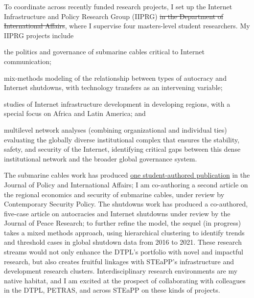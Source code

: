 \documentclass[11pt]{letter}
\begin{document}
\begin{letter}
To coordinate across recently funded research projects, I set up the Internet Infrastructure and Policy Research Group (IIPRG) \sout{in the Department of International Affairs}, where I supervise four masters-level student researchers.
%
My IIPRG projects include %
%
\begin{inparaenum}
  \item the politics and governance of submarine cables critical to Internet communication; 
  \item mix-methods modeling of the relationship between types of autocracy and Internet shutdowns, with technology transfers as an intervening variable; 
  \item studies of Internet infrastructure development in developing regions, with a special focus on Africa and Latin America; and 
  \item multilevel network analyses (combining organizational and individual ties) evaluating the globally diverse institutional complex that ensures the stability, safety, and security of the Internet, identifying critical gaps between this dense institutional network and the broader global governance system.
\end{inparaenum}  
%
The submarine cables work has produced \href{https://jpia.princeton.edu/news/leveraging-submarine-cables-political-gain-us-responses-chinese-strategy}{one student-authored publication} in the Journal of Policy and International Affairs; I am co-authoring a second article on the regional economics and security of submarine cables, under review by Contemporary Security Policy.
%
The shutdowns work has produced a co-authored, five-case article on autocracies and Internet shutdowns under review by the Journal of Peace Research; to further refine the model, the sequel (in progress) takes a mixed methods approach, using hierarchical clustering to identify trends and threshold cases in global shutdown data from 2016 to 2021. 
%
These research streams would not only enhance the DTPL's portfolio with novel and impactful research, but also creates fruitful linkages with STEaPP's infrastructure and development research clusters.
%
Interdisciplinary research environments are my native habitat, and I am excited at the prospect of collaborating with colleagues in the DTPL, PETRAS, and across STEaPP on these kinds of projects.
% 
%



\end{letter}
\end{document}
